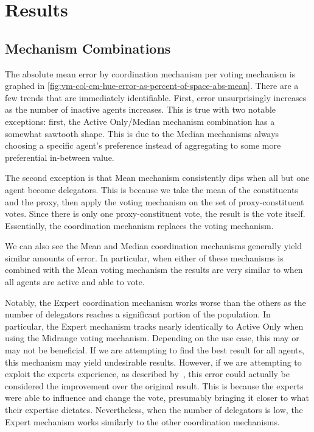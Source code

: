 \section{Results}\label{sec:results}

\subsection{Mechanism Combinations}\label{subsec:mechanism-combinations}
The absolute mean error by coordination mechanism per voting mechanism is graphed in
\autoref{fig:vm-col-cm-hue-error-as-percent-of-space-abs-mean}.
There are a few trends that are immediately identifiable.
First, error unsurprisingly increases as the number of inactive agents increases.
This is true with two notable exceptions: first, the Active Only/Median
mechanism combination has a somewhat sawtooth shape.
This is due to the Median mechanisms always choosing a specific agent's preference
instead of aggregating to some more preferential in-between value.

The second exception is that Mean mechanism consistently dips when all but one agent
become delegators.
This is because we take the mean of the constituents and the proxy, then apply the
voting mechanism on the set of proxy-constituent votes.
Since there is only one proxy-constituent vote, the result is the vote itself.
Essentially, the coordination mechanism replaces the voting mechanism.

We can also see the Mean and Median coordination mechanisms generally yield similar
amounts of error.
In particular, when either of these mechanisms is combined with the Mean voting
mechanism the results are very similar to when all agents are active and able to vote.

Notably, the Expert coordination mechanism works worse than the others as the number
of delegators reaches a significant portion of the population.
In particular, the Expert mechanism tracks nearly identically to Active Only when
using the Midrange voting mechanism.
Depending on the use case, this may or may not be beneficial.
If we are attempting to find the best result for all agents, this mechanism may yield
undesirable results.
However, if we are attempting to exploit the experts experience, as described
by~\cite{Miller1969}, this error could actually be considered the improvement over
the original result.
This is because the experts were able to influence and change the vote, presumably
bringing it closer to what their expertise dictates.
Nevertheless, when the number of delegators is low, the Expert mechanism works
similarly to the other coordination mechanisms.

